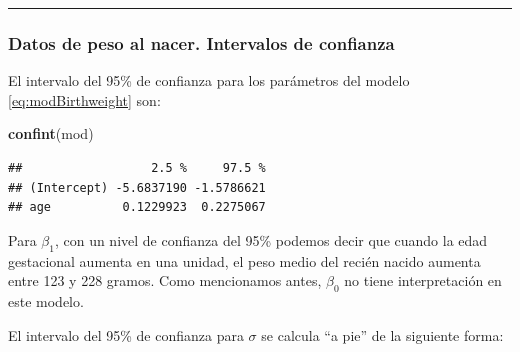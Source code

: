 \documentclass[
]{article}
\newenvironment{Shaded}{\begin{snugshade}}{\end{snugshade}}
\newcommand{\AttributeTok}[1]{\textcolor[rgb]{0.13,0.29,0.53}{#1}}
\newcommand{\DecValTok}[1]{\textcolor[rgb]{0.00,0.00,0.81}{#1}}
\newcommand{\FloatTok}[1]{\textcolor[rgb]{0.00,0.00,0.81}{#1}}
\newcommand{\FunctionTok}[1]{\textcolor[rgb]{0.13,0.29,0.53}{\textbf{#1}}}
\newcommand{\NormalTok}[1]{#1}
\newcommand{\OtherTok}[1]{\textcolor[rgb]{0.56,0.35,0.01}{#1}}
\newcommand{\SpecialCharTok}[1]{\textcolor[rgb]{0.81,0.36,0.00}{\textbf{#1}}}
\begin{document}
\rule{\textwidth}{0.4pt}

\hypertarget{datos-de-peso-al-nacer.-intervalos-de-confianza}{%
\subsubsection*{Datos de peso al nacer. Intervalos de confianza}\label{datos-de-peso-al-nacer.-intervalos-de-confianza}}

El intervalo del 95\% de confianza para los parámetros del modelo \eqref{eq:modBirthweight} son:

\begin{Shaded}
\begin{Highlighting}[]
\FunctionTok{confint}\NormalTok{(mod)}
\end{Highlighting}
\end{Shaded}

\begin{verbatim}
##                  2.5 %     97.5 %
## (Intercept) -5.6837190 -1.5786621
## age          0.1229923  0.2275067
\end{verbatim}

Para \(\beta_{1}\), con un nivel de confianza del 95\% podemos decir que cuando la edad gestacional aumenta en una unidad, el peso medio del recién nacido aumenta entre 123 y 228 gramos. Como mencionamos antes, \(\beta_{0}\) no tiene interpretación en este modelo.

El intervalo del 95\% de confianza para \(\sigma\) se calcula ``a pie'' de la siguiente forma:

\begin{Shaded}
\end{Shaded}
\end{document}
